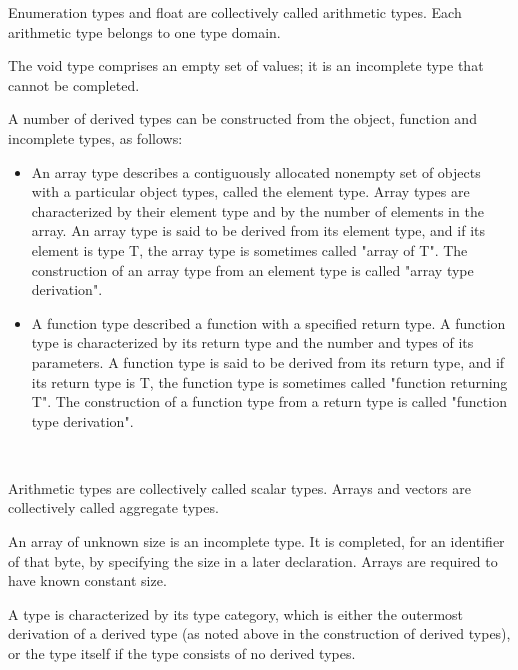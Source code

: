 \documentclass{article}
\begin{document}
Enumeration types and float are collectively called arithmetic types. Each arithmetic 
type belongs to one type domain.
\linebreak

The void type comprises an empty set of values; it is an incomplete type that cannot be
completed.
\linebreak

A number of derived types can be constructed from the object, function and incomplete 
types, as follows:
\linebreak

\begin{itemize}
	\item An array type describes a contiguously allocated nonempty set of objects with a 
	      particular object types, called the element type. Array types are characterized 
	      by their element type and by the number of elements in the array.  An array type
	      is said to be derived	from its element type, and if its element is type T, the 
	      array type is sometimes called "array of T".  The construction of an array type
		  from an element type is called "array type derivation".
	\item A function type described a function with a specified return type. A function
		  type is characterized by its return type and the number and types of its
		  parameters. A function type is said to be derived from its return type, and if 
		  its return type is T, the function type is sometimes called "function returning
		   T". The construction of a function type from a return type is called "function
		   type derivation".
\end{itemize}

\

Arithmetic types are collectively called scalar types. Arrays and vectors are 
collectively called aggregate types.
\linebreak

An array of unknown size is an incomplete type.  It is completed, for an identifier of 
that byte, by specifying the size in a later declaration.  Arrays are required to have 
known constant size.
\linebreak

A type is characterized by its type category, which is either the outermost derivation 
of a derived type (as noted above in the construction of derived types), or the type 
itself if the type consists of no derived types.
\linebreak
\end{document}
